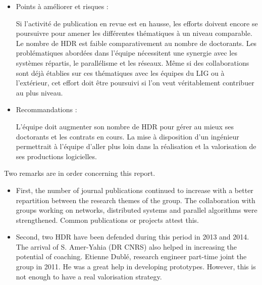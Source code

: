 \begin{itemize}
\setlength{\itemsep}{-0.1cm}
\item Points {\`a} am{\'e}liorer et risques :\\
\begin{it} Si l'activit{\'e}  de publication en revue est en hausse, les efforts doivent encore se poursuivre pour amener les diff{\'e}rentes th{\'e}matiques {\`a} un niveau comparable. Le nombre de HDR est faible comparativement au nombre de doctorants.
Les probl{\'e}matiques abord{\'e}es dans l'{\'e}quipe n{\'e}cessitent une synergie avec les syst{\`e}mes r{\'e}partis, le parall{\'e}lisme et les r{\'e}seaux. M{\^e}me si des collaborations sont d{\'e}j{\`a}  {\'e}tablies sur ces th{\'e}matiques avec les {\'e}quipes du LIG ou {\`a} l'ext{\'e}rieur, cet effort doit {\^e}tre poursuivi si l'on veut v{\'e}ritablement contribuer au plus niveau.\\
\end{it}
\item Recommandations :\\
\begin{it} L'{\'e}quipe doit augmenter son nombre de HDR pour g{\'e}rer au mieux ses doctorants et les contrats en cours. La mise {\`a} disposition d'un ing{\'e}nieur permettrait {\`a} l'{\'e}quipe d'aller plus loin dans la r{\'e}alisation et la valorisation de ses productions logicielles.
\end{it}
\end{itemize}


\noindent Two remarks are in order concerning this report.
\begin{itemize} 
\setlength{\itemsep}{-0.4cm}
\item First, the number of journal publications continued to increase  with a better repartition between the research themes of the group. The collaboration with groups working on networks, distributed systems and parallel algorithms were strengthened. Common publications or projects attest this. \\
\item Second, two  HDR  have been defended during this period in 2013 and 2014. The arrival of S. Amer-Yahia (DR CNRS) also helped in increasing the potential of coaching. 
Etienne Dubl{\'e}, research engineer part-time joint the group in 2011. He was a great help in developing prototypes. However, this  is not enough to have  a real valorisation strategy. 
\end{itemize}



